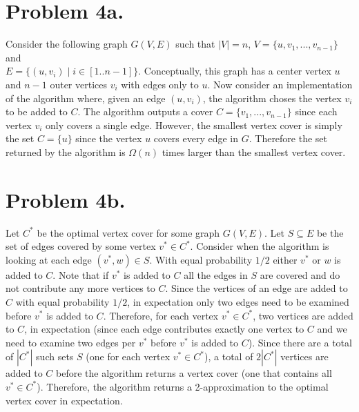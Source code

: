 \documentclass[12pt]{article}
\begin{document}
\pagestyle{plain}
\titleformat{\subsection}[runin]
  {\normalfont\large\bfseries}{\thesubsection}{1em}{}
\titleformat{\subsubsection}[runin]
  {\normalfont\large\bfseries}{\thesubsubsection}{1em}{}

\section*{Problem 4a.}
Consider the following graph $G(V,E)$ such that $|V| = n$,
$V = \{u, v_1, ..., v_{n-1}\}$ and \\
$E = \{(u,v_i) \mid i \in [1..n-1]\}$. Conceptually, this graph has a center
vertex $u$ and $n-1$ outer vertices $v_i$ with edges only to $u$. Now consider
an implementation of the algorithm where, given an edge $(u,v_i)$, the algorithm
choses the vertex $v_i$ to be added to $C$. The algorithm outputs a cover
$C = \{v_1,...,v_{n-1}\}$ since each vertex $v_i$ only covers a single edge.
However, the smallest vertex cover is simply the set $C = \{u\}$ since the
vertex $u$ covers every edge in $G$. Therefore the set returned by the algorithm
is $\Omega(n)$ times larger than the smallest vertex cover.

\section*{Problem 4b.}
Let $C^*$ be the optimal vertex cover for some graph $G(V,E)$. Let
$S \subseteq E$ be the set of edges covered by some vertex $v^* \in C^*$.
Consider when the algorithm is looking at each edge $(v^*,w) \in S$. With equal
probability $1/2$ either $v^*$ or $w$ is added to $C$. Note that if $v^*$ is
added to $C$ all the edges in $S$ are covered and do not contribute any more
vertices to $C$. Since the vertices of an edge are added to $C$ with equal
probability $1/2$, in expectation only two edges need to be examined before
$v^*$ is added to $C$. Therefore, for each vertex $v^* \in C^*$, two vertices
are added to $C$, in expectation (since each edge contributes exactly one vertex
to $C$ and we need to examine two edges per $v^*$ before $v^*$ is added to $C$).
Since there are a total of $|C^*|$ such sets $S$ (one for each vertex
$v^* \in C^*$), a total of $2|C^*|$ vertices are added to $C$ before the
algorithm returns a vertex cover (one that contains all $v^* \in C^*$).
Therefore, the algorithm returns a 2-approximation to the optimal vertex cover
in expectation.
\end{document}
